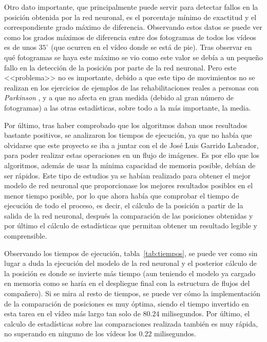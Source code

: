{Otro dato importante, que principalmente puede servir para detectar fallos en la posición obtenida por la red neuronal, es el porcentaje mínimo de exactitud y el correspondiente grado máximo de diferencia. Observando estos datos se puede ver como los grados máximos de diferencia entre dos fotogramas de todos los vídeos es de unos $35^{\circ}$ (que ocurren en el vídeo donde se está de pie). Tras observar en qué fotogramas se haya este máximo se vio como este valor se debía a un pequeño fallo en la detección de la posición por parte de la red neuronal. Pero este <<problema>> no es importante, debido a que este tipo de movimientos no se realizan en los ejercicios de ejemplos de las rehabilitaciones reales a personas con \textit{Parkinson} , y a que no afecta en gran medida (debido al gran número de fotogramas) a las otras estadísticas, sobre todo a la más importante, la media.

Por último, tras haber comprobado que los algoritmos daban unos resultados bastante positivos, se analizaron los tiempos de ejecución, ya que no había que olvidarse que este proyecto se iba a juntar con el de José Luis Garrido Labrador, para poder realizar estas operaciones en un flujo de imágenes. Es por ello que los algoritmos, además de usar la mínima capacidad de memoria posible, debían de ser rápidos. Este tipo de estudios ya se habían realizado para obtener el mejor modelo de red neuronal que proporcionase los mejores resultados posibles en el menor tiempo posible, por lo que ahora había que comprobar el tiempo de ejecución de todo el proceso, es decir,  el cálculo de la posición a partir de la salida de la red neuronal, después la comparación de las posiciones obtenidas y por último el cálculo de estadísticas que permitan obtener un resultado legible y comprensible.

Observando los tiempos de ejecución, tabla~\ref{tab:tiempos}, se puede ver como sin lugar a duda la ejecución del modelo de la red neuronal y el posterior cálculo de la posición es donde se invierte más tiempo (aun teniendo el modelo ya cargado en memoria como se haría en el despliegue final con la estructura de flujos del compañero). Si se mira al resto de tiempos, se puede ver cómo la implementación de la comparación de posiciones es muy óptima, siendo el tiempo invertido en esta tarea en el vídeo más largo tan solo de $80.24$ milisegundos. Por último, el calculo de estadísticas sobre las comparaciones realizada también es muy rápida, no superando en ninguno de los vídeos los $0.22$ milisegundos.

}
